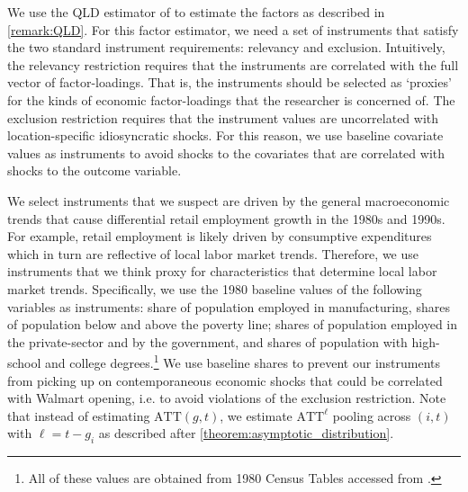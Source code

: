 \documentclass[12pt]{article}
\def\ATT{\text{ATT}}
\begin{document}
We use the QLD estimator of \citet{Ahn_Lee_Schmidt_2013} to estimate the factors as described in \autoref{remark:QLD}. For this factor estimator, we need a set of instruments that satisfy the two standard instrument requirements: relevancy and exclusion. Intuitively, the relevancy restriction requires that the instruments are correlated with the full vector of factor-loadings. That is, the instruments should be selected as `proxies' for the kinds of economic factor-loadings that the researcher is concerned of. The exclusion restriction requires that the instrument values are uncorrelated with location-specific idiosyncratic shocks. For this reason, we use baseline covariate values as instruments to avoid shocks to the covariates that are correlated with shocks to the outcome variable. 

We select instruments that we suspect are driven by the general macroeconomic trends that cause differential retail employment growth in the 1980s and 1990s. For example, retail employment is likely driven by consumptive expenditures which in turn are reflective of local labor market trends. Therefore, we use instruments that we think proxy for characteristics that determine local labor market trends. Specifically, we use the 1980 baseline values of the following variables as instruments: share of population employed in manufacturing, shares of population below and above the poverty line; shares of population employed in the private-sector and by the government, and shares of population with high-school and college degrees.\footnote{All of these values are obtained from 1980 Census Tables accessed from \citet{manson2020ipums}.} We use baseline shares to prevent our instruments from picking up on contemporaneous economic shocks that could be correlated with Walmart opening, i.e. to avoid violations of the exclusion restriction. Note that instead of estimating $\ATT(g,t)$, we estimate $\ATT^\ell$ pooling across $(i, t)$ with $\ell = t - g_i$ as described after \autoref{theorem:asymptotic_distribution}.
\end{document}
